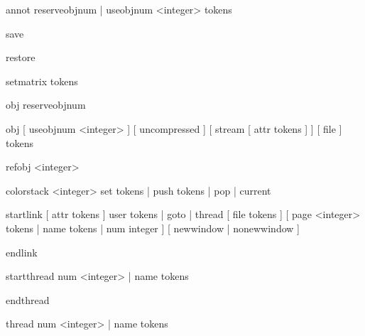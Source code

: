 \begin{typing}
\pdfextension annot
    reserveobjnum | useobjnum <integer>
    { tokens }
\end{typing}

\begin{typing}
\pdfextension save
\end{typing}

\begin{typing}
\pdfextension restore
\end{typing}

\begin{typing}
\pdfextension setmatrix
    { tokens }
\end{typing}

\begin{typing}
[ \immediate ] \pdfextension obj
    reserveobjnum
\end{typing}

\begin{typing}
[ \immediate ] \pdfextension obj
    [ useobjnum <integer> ]
    [ uncompressed ]
    [ stream  [ attr { tokens } ] ]
    [ file ]
    { tokens }
\end{typing}

\begin{typing}
\pdfextension refobj
    <integer>
\end{typing}

\begin{typing}
\pdfextension colorstack
    <integer>
    set { tokens } | push { tokens } | pop | current
\end{typing}

\begin{typing}
\pdfextension startlink
    [ attr { tokens } ]
    user { tokens } | goto | thread
    [ file { tokens } ]
    [ page <integer> { tokens } | name { tokens } | num  integer ]
    [ newwindow  | nonewwindow ]
\end{typing}

\begin{typing}
\pdfextension endlink
\end{typing}

\begin{typing}
\pdfextension startthread
    num <integer> | name { tokens }
\end{typing}

\begin{typing}
\pdfextension endthread
\end{typing}

\begin{typing}
\pdfextension thread
    num <integer> | name { tokens }
\end{typing}

